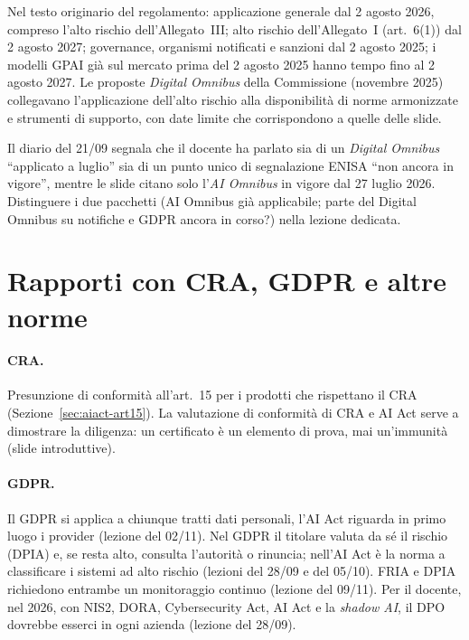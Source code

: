 \begin{integrazione}
Nel testo originario del regolamento: applicazione generale dal 2 agosto 2026, compreso l'alto rischio
dell'Allegato~III; alto rischio dell'Allegato~I (art.~6(1)) dal 2 agosto 2027; governance, organismi
notificati e sanzioni dal 2 agosto 2025; i modelli GPAI già sul mercato prima del 2 agosto 2025 hanno
tempo fino al 2 agosto 2027. Le proposte \emph{Digital Omnibus} della Commissione (novembre 2025)
collegavano l'applicazione dell'alto rischio alla disponibilità di norme armonizzate e strumenti di
supporto, con date limite che corrispondono a quelle delle slide.
\end{integrazione}

\begin{verifica}
Il diario del 21/09 segnala che il docente ha parlato sia di un \emph{Digital Omnibus} ``applicato a
luglio'' sia di un punto unico di segnalazione ENISA ``non ancora in vigore'', mentre le slide citano
solo l'\emph{AI Omnibus} in vigore dal 27 luglio 2026. Distinguere i due pacchetti (AI Omnibus già
applicabile; parte del Digital Omnibus su notifiche e GDPR ancora in corso?) nella lezione dedicata.
\end{verifica}

\section{Rapporti con CRA, GDPR e altre norme}
\label{sec:aiact-rapporti}

\paragraph{CRA.} Presunzione di conformità all'art.~15 per i prodotti che rispettano il CRA
(Sezione~\ref{sec:aiact-art15}). La valutazione di conformità di CRA e AI Act serve a dimostrare la
diligenza: un certificato è un elemento di prova, mai un'immunità (slide introduttive).

\paragraph{GDPR.} Il GDPR si applica a chiunque tratti dati personali, l'AI Act riguarda in primo luogo i
provider (lezione del 02/11). Nel GDPR il titolare valuta da sé il rischio (DPIA) e, se resta alto,
consulta l'autorità o rinuncia; nell'AI Act è la norma a classificare i sistemi ad alto rischio (lezioni
del 28/09 e del 05/10). FRIA e DPIA richiedono entrambe un monitoraggio continuo (lezione del 09/11).
Per il docente, nel 2026, con NIS2, DORA, Cybersecurity Act, AI Act e la \emph{shadow AI}, il DPO
dovrebbe esserci in ogni azienda (lezione del 28/09).

